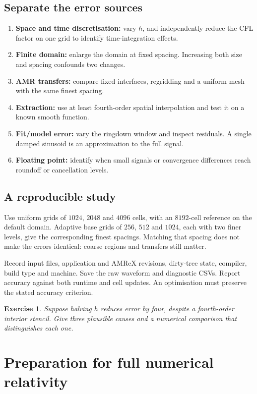 \documentclass[11pt,a4paper]{article}
\numberwithin{equation}{section}
\newtheorem{exercise}{Exercise}[section]
\begin{document}
\subsection{Separate the error sources}
\begin{enumerate}
\item \textbf{Space and time discretisation:} vary $h$, and independently
      reduce the CFL factor on one grid to identify time-integration effects.
\item \textbf{Finite domain:} enlarge the domain at fixed spacing.
      Increasing both size and spacing confounds two changes.
\item \textbf{AMR transfers:} compare fixed interfaces, regridding and a
      uniform mesh with the same finest spacing.
\item \textbf{Extraction:} use at least fourth-order spatial interpolation
      and test it on a known smooth function.
\item \textbf{Fit/model error:} vary the ringdown window and inspect residuals.
      A single damped sinusoid is an approximation to the full signal.
\item \textbf{Floating point:} identify when small signals or convergence
      differences reach roundoff or cancellation levels.
\end{enumerate}

\subsection{A reproducible study}
Use uniform grids of $1024$, $2048$ and $4096$ cells, with an $8192$-cell
reference on the default domain. Adaptive base grids of $256$, $512$ and
$1024$, each with two finer levels, give the corresponding finest spacings.
Matching that spacing does not make the errors identical: coarse regions
and transfers still matter.

Record input files, application and AMReX revisions, dirty-tree state,
compiler, build type and machine. Save the raw waveform and diagnostic CSVs.
Report accuracy against both runtime and cell updates. An optimisation
must preserve the stated accuracy criterion.

\begin{exercise}
Suppose halving $h$ reduces error by four, despite a fourth-order interior
stencil. Give three plausible causes and a numerical comparison that
distinguishes each one.
\end{exercise}

\section{Preparation for full numerical relativity}\label{sec:fullnr}
\end{document}
